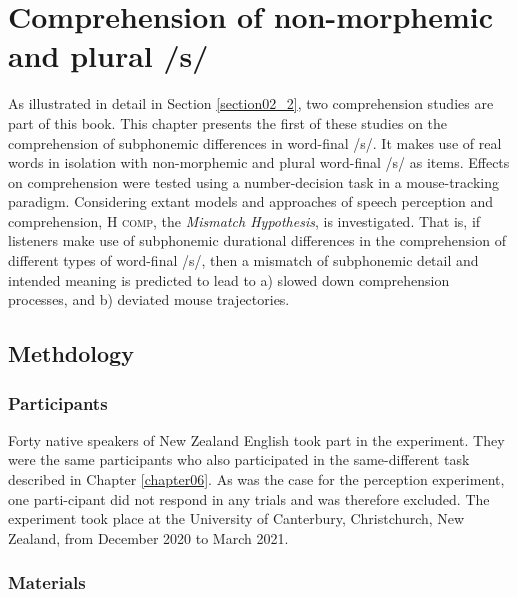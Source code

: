 \chapter{Comprehension of non-morphemic and plural /s/}\label{chapter07}

As illustrated in detail in Section \ref{section02_2}, two comprehension studies are part of this book. This chapter presents the first of these studies on the comprehension of subphonemic differences in word-final /s/. It makes use of real words in isolation with non-morphemic and plural word-final /s/ as items. Effects on comprehension were tested using a number-decision task in a mouse-tracking paradigm. Considering extant models and approaches of speech perception and comprehension, \textsc{H comp}, the \textit{Mismatch Hypothesis}, is investigated. That is, if listeners make use of subphonemic durational differences in the comprehension of different types of word-final /s/, then a mismatch of subphonemic detail and intended meaning is predicted to lead to a) slowed down comprehension processes, and b) deviated mouse trajectories. 

\section{Methdology}\label{section07_1}

\subsection{Participants}\label{section07_1_1}

Forty native speakers of New Zealand English took part in the experiment. They were the same participants who also participated in the same-different task described in Chapter \ref{chapter06}. As was the case for the perception experiment, one parti-cipant did not respond in any trials and was therefore excluded. The experiment took place at the University of Canterbury, Christchurch, New Zealand, from December 2020 to March 2021.

\subsection{Materials}\label{section07_1_2}

